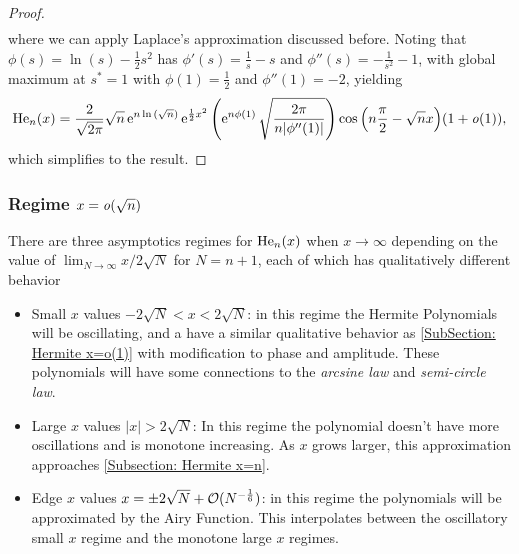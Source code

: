 \begin{proof}
\begin{align}
	\end{align}
	where we can apply Laplace's approximation discussed before. Noting that $\phi(s) = \ln{(s)} - \frac{1}{2}s^2$ has $\phi'(s) = \frac{1}{s} - s$ and $\phi''(s) = -\frac{1}{s^2} - 1$, with global maximum at $s^* = 1$ with $\phi(1) = \frac{1}{2}$ and $\phi''(1) = -2$, yielding
	\begin{align}
		 \mathrm{He}_n(x) = \frac{2}{\sqrt{2\pi}} \sqrt{n} \operatorname{e}^{n\ln{(\sqrt{n})}} \operatorname{e}^{\frac{1}{2}x^2}  \left( \operatorname{e}^{n\phi(1)} \sqrt{\frac{2\pi}{n|\phi''(1)|}} \right) \cos{\left(n\frac{\pi}{2} - \sqrt{n}x\right)} (1+\mathit{o}(1)),
	\end{align}
	which simplifies to the result.
\end{proof}

\subsubsection{Regime $x = \mathit{o}(\sqrt{n})$}

There are three asymptotics regimes for $\mathrm{He}_n(x)$ when $x \rightarrow \infty$ depending on the value of $\lim_{N \rightarrow \infty} x/2\sqrt{N}$ for $N = n+1$, each of which has qualitatively different behavior
\begin{itemize}
	\item Small $x$ values $-2\sqrt{N} < x < 2\sqrt{N}$: in this regime the Hermite Polynomials will be oscillating, and a have a similar qualitative behavior as \ref{SubSection: Hermite x=o(1)} with modification to phase and amplitude. These polynomials will have some connections to the \textit{arcsine law} and \textit{semi-circle law}.
	\item Large $x$ values $|x| > 2\sqrt{N}$: In this regime the polynomial doesn't have more oscillations and is monotone increasing. As $x$ grows larger, this approximation approaches \ref{Subsection: Hermite x=n}.
	\item Edge $x$ values $x = \pm 2\sqrt{N} + \mathcal{O}(N^{-\frac{1}{6}})$: in this regime the polynomials will be approximated by the Airy Function. This interpolates between the oscillatory small $x$ regime and the monotone large $x$ regimes. 
\end{itemize} 

